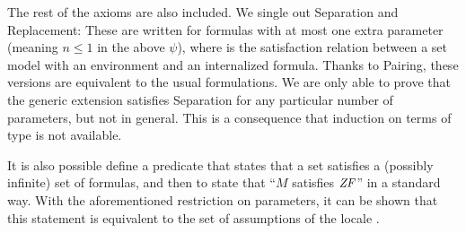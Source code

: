 The rest of the axioms are also
included. We single out Separation and Replacement: These are written
for formulas with at most one extra parameter (meaning $n\leq 1$ in the
above $\psi$), where  is the satisfaction
relation between a set model with an environment and an internalized
formula. Thanks to Pairing, these 
versions are equivalent to the usual formulations. We are only able to
prove that the generic extension satisfies Separation for any particular
number of parameters, but not in general. This is a consequence that
induction on terms of type \tyo{} is not available.

It is also possible define a predicate that states that a set
satisfies a (possibly infinite) set of formulas, and then to state
that ``$M$ satisfies $\mathit{ZF}$'' in a standard way. With the
aforementioned restriction on parameters, it can be shown that this
statement is equivalent to the set of assumptions of the locale
.
%

